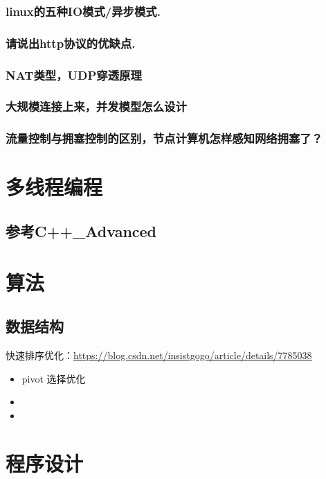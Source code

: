 \documentclass[UTF8,a4paper,8pt]{ctexart}
\begin{document}
		\subsubsection{linux的五种IO模式/异步模式.}
		
		\subsubsection{请说出http协议的优缺点.}
		
		\subsubsection{NAT类型，UDP穿透原理}
		
		\subsubsection{大规模连接上来，并发模型怎么设计}
		
		\subsubsection{流量控制与拥塞控制的区别，节点计算机怎样感知网络拥塞了？}
		
		

\newpage
\section{多线程编程}
	\subsection{参考C++\_Advanced}

\newpage
\section{算法}
	\subsection{数据结构}
	
		快速排序优化：\url{https://blog.csdn.net/insistgogo/article/details/7785038}
			\begin{itemize}
				\item pivot 选择优化
				\item 
				\item 
			\end{itemize}
			

\newpage
\section{程序设计}
\end{document}

